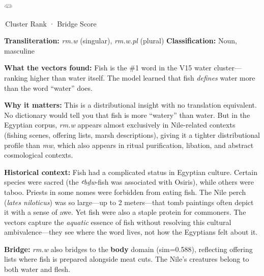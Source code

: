 \documentclass[11pt, a4paper]{article}
\newcommand{\bighiero}[1]{{\normalfont\hierofont\fontsize{48}{56}\selectfont #1}}
\newcommand{\displayglyph}[1]{%
  \begin{center}
  \bighiero{#1}
  \end{center}
  \vspace{-6pt}
}
\newcommand{\methodtag}[1]{%
  \noindent\colorbox{tagbg}{\small\sffamily\color{nightsky}\,#1\,}\par\smallskip%
}
\newenvironment{insightbox}[1][]{%
  \def\boxtitle{#1}%
  \begin{oframed}%
  \noindent{\bfseries\color{lapis}\boxtitle}\par\smallskip%
}{%
  \end{oframed}%
}
\begin{document}
\begin{insightbox}[\textit{rm.w} --- Fish \hfill Bridge Score: 0.581]

\displayglyph{𓆛}

\methodtag{Cluster Rank · Bridge Score}

\textbf{Transliteration:} \textit{rm.w} (singular), \textit{rm.w.pl} (plural) \quad
\textbf{Classification:} Noun, masculine

\medskip
\textbf{What the vectors found:} Fish is the \#1 word in the V15 water cluster---ranking higher than water itself. The model learned that fish \emph{defines} water more than the word ``water'' does.

\medskip
\textbf{Why it matters:} This is a distributional insight with no translation equivalent. No dictionary would tell you that fish is more ``watery'' than water. But in the Egyptian corpus, \textit{rm.w} appears almost exclusively in Nile-related contexts (fishing scenes, offering lists, marsh descriptions), giving it a tighter distributional profile than \textit{mw}, which also appears in ritual purification, libation, and abstract cosmological contexts.

\medskip
\textbf{Historical context:} Fish had a complicated status in Egyptian culture. Certain species were sacred (the \textit{ꜥbḏw}-fish was associated with Osiris), while others were taboo. Priests in some nomes were forbidden from eating fish. The Nile perch (\textit{lates niloticus}) was so large---up to 2 meters---that tomb paintings often depict it with a sense of awe. Yet fish were also a staple protein for commoners. The vectors capture the \emph{aquatic} essence of fish without resolving this cultural ambivalence---they see where the word lives, not how the Egyptians felt about it.

\medskip
\textbf{Bridge:} \textit{rm.w} also bridges to the \textbf{body} domain (sim=0.588), reflecting offering lists where fish is prepared alongside meat cuts. The Nile's creatures belong to both water and flesh.
\end{insightbox}
\end{document}
